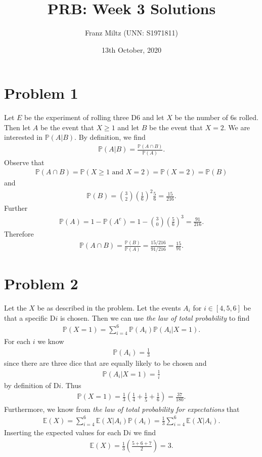 \documentclass{article}
\title{PRB: Week 3 Solutions}
\author{Franz Miltz (UNN: S1971811)}
\renewcommand{\P}{\mathbb{P}}
\newcommand{\E}{\mathbb{E}}
\begin{document}
\date{13th October, 2020}
\maketitle
\section*{Problem 1}
Let $E$ be the experiment of rolling three D6 and let $X$ be the number of 6s rolled.
Then let $A$ be the event that $X\geq 1$ and let $B$ be the event that $X=2$. 
We are interested in $\P(A|B)$. By definition, we find
\begin{align*}
  \P(A|B) = \frac{\P(A\cap B)}{\P(A)}.
\end{align*}
Observe that 
\begin{align*}
  \P(A\cap B) = \P(X\geq 1 \text{ and } X = 2) = \P(X=2) = \P(B)
\end{align*}
and
\begin{align*}
  \P(B) = \binom{3}{2}\left(\frac{1}{6}\right)^2\frac{5}{6}=\frac{15}{216}.
\end{align*}
Further
\begin{align*}
  \P(A) = 1-\P(A^c) = 1-\binom{3}{0}\left(\frac{5}{6}\right)^3=\frac{91}{216}.
\end{align*}
Therefore
\begin{align*}
  \P(A\cap B) = \frac{\P(B)}{\P(A)}= \frac{15/216}{91/216} = \frac{15}{91}.
\end{align*}
\section*{Problem 2}
Let the $X$ be as described in the problem. Let the events
$A_i$ for $i\in[4,5,6]$ be that a specific D$i$ is chosen.
Then we can use \emph{the law of total probability} to find
\begin{align*}
  \P(X=1)=\sum_{i=4}^6\P(A_i)\P(A_i|X=1).
\end{align*}
For each $i$ we know
\begin{align*}
  \P(A_i) = \frac{1}{3} 
\end{align*}
since there are three dice that are equally likely to be chosen and
\begin{align*}
  \P(A_i|X=1) = \frac{1}{i}
\end{align*}
by definition of D$i$.
Thus 
\begin{align*}
  \P(X=1) = \frac{1}{3}\left(\frac{1}{4}+\frac{1}{5}+\frac{1}{6}\right)=\frac{37}{180}.
\end{align*}
Furthermore, we know from \emph{the law of total probability for expectations} that
\begin{align*}
  \E(X) = \sum_{i=4}^6 \E(X|A_i)\P(A_i) = \frac{1}{3}\sum_{i=4}^6\E(X|A_i).
\end{align*}
Inserting the expected values for each D$i$ we find
\begin{align*}
  \E(X) = \frac{1}{3}\left(\frac{5 + 6 + 7}{2}\right)=3.
\end{align*}
\end{document}
